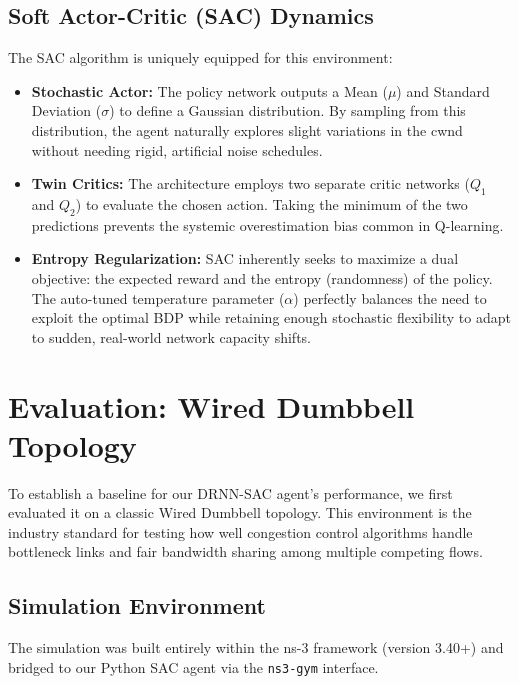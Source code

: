 \documentclass[12pt, a4paper]{article}
\begin{document}
\subsection{Soft Actor-Critic (SAC) Dynamics}
The SAC algorithm is uniquely equipped for this environment:
\begin{itemize}
    \item \textbf{Stochastic Actor:} The policy network outputs a Mean ($\mu$) and Standard Deviation ($\sigma$) to define a Gaussian distribution. By sampling from this distribution, the agent naturally explores slight variations in the cwnd without needing rigid, artificial noise schedules.
    \item \textbf{Twin Critics:} The architecture employs two separate critic networks ($Q_1$ and $Q_2$) to evaluate the chosen action. Taking the minimum of the two predictions prevents the systemic overestimation bias common in Q-learning.
    \item \textbf{Entropy Regularization:} SAC inherently seeks to maximize a dual objective: the expected reward and the entropy (randomness) of the policy. The auto-tuned temperature parameter ($\alpha$) perfectly balances the need to exploit the optimal BDP while retaining enough stochastic flexibility to adapt to sudden, real-world network capacity shifts.
\end{itemize}


\clearpage

\section{Evaluation: Wired Dumbbell Topology}

To establish a baseline for our DRNN-SAC agent's performance, we first evaluated it on a classic Wired Dumbbell topology. This environment is the industry standard for testing how well congestion control algorithms handle bottleneck links and fair bandwidth sharing among multiple competing flows.

\subsection{Simulation Environment}
The simulation was built entirely within the ns-3 framework (version 3.40+) and bridged to our Python SAC agent via the \texttt{ns3-gym} interface. 
\end{document}

